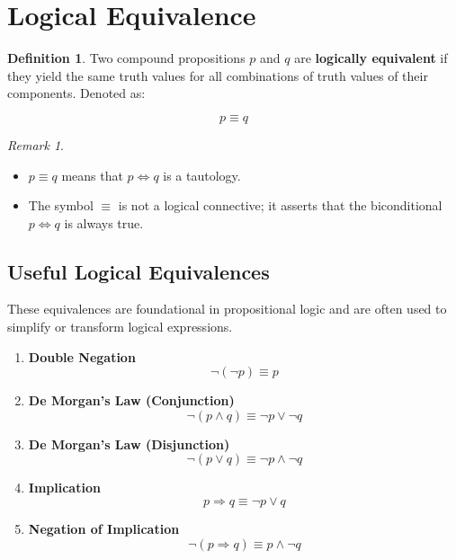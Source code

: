 \documentclass[
]{book}
\providecommand{\tightlist}{%
  \setlength{\itemsep}{0pt}\setlength{\parskip}{0pt}}
\theoremstyle{definition}
\newtheorem{definition}{Definition}[chapter]
\theoremstyle{definition}
\theoremstyle{definition}
\theoremstyle{definition}
\theoremstyle{remark}
\newtheorem*{remark}{Remark}
\begin{document}
\section{Logical Equivalence}\label{logical-equivalence}

\begin{definition}
\protect\hypertarget{def:unnamed-chunk-39}{}\label{def:unnamed-chunk-39}Two compound propositions \(p\) and \(q\) are \textbf{logically equivalent} if they yield the same truth values for all combinations of truth values of their components. Denoted as:

\[
p \equiv q
\]
\end{definition}

\begin{remark}
\leavevmode

\begin{itemize}
\tightlist
\item
  \(p \equiv q\) means that \(p \iff q\) is a tautology.
\item
  The symbol \(\equiv\) is not a logical connective; it asserts that the biconditional \(p \iff q\) is always true.
\end{itemize}

\end{remark}

\subsection{Useful Logical Equivalences}\label{useful-logical-equivalences}

These equivalences are foundational in propositional logic and are often used to simplify or transform logical expressions.

\begin{enumerate}
\def\labelenumi{\arabic{enumi}.}
\item
  \textbf{Double Negation}\\
  \[
  \neg(\neg p) \equiv p
  \]
\item
  \textbf{De Morgan's Law (Conjunction)}\\
  \[
  \neg(p \land q) \equiv \neg p \lor \neg q
  \]
\item
  \textbf{De Morgan's Law (Disjunction)}\\
  \[
  \neg(p \lor q) \equiv \neg p \land \neg q
  \]
\item
  \textbf{Implication}\\
  \[
  p \Rightarrow q \equiv \neg p \lor q
  \]
\item
  \textbf{Negation of Implication}\\
  \[
  \neg(p \Rightarrow q) \equiv p \land \neg q
  \]
\end{enumerate}
\end{document}
